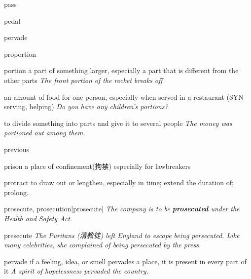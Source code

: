 \begin{word}{pass}
\end{word}

\begin{word}{pedal}
\end{word}

\begin{word}{pervade}
\end{word}

\begin{word}{proportion}
\end{word}

\begin{word}{portion}
    a part of something larger, especially a part that is different from the other parts
    \textit{The front portion of the rocket breaks off}

    an amount of food for one person, especially when served in a restaurant (SYN  serving, helping)
    \textit{Do you have any children’s portions?}

    to divide something into parts and give it to several people
    \textit{The money was portioned out among them.}
\end{word}

\begin{word}{previous}
\end{word}

\begin{word}{prison}
    a place of confinement(拘禁) especially for lawbreakers
\end{word}

\begin{word}{protract}
    to draw out or lengthen, especially in time; extend the duration of; prolong.
\end{word}

\begin{word}{prosecute, prosecution}[prosecute]
    \textit{The company is to be \textbf{prosecuted} under the Health and Safety Act.}
\end{word}

\begin{word}{presecute}
    \textit{The Puritans (清教徒) left England to escape being persecuted. Like many celebrities, she complained of being persecuted by the press.}
\end{word}

\begin{word}{pervade}
    if a feeling, idea, or smell pervades a place, it is present in every part of it
    \textit{A spirit of hopelessness pervaded the country.}
\end{word}